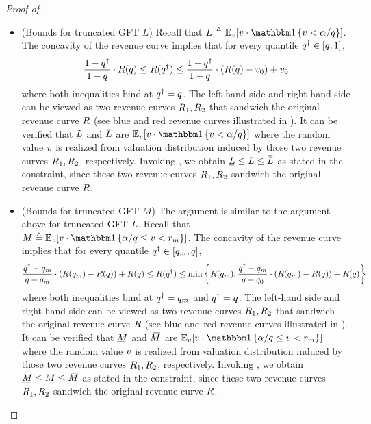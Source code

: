 \begin{proof}[Proof of ]
\begin{itemize}
        \item (Bounds for truncated GFT $L$) Recall that $L \triangleq \expect[\val]{\val\cdot \indicator{ \val < \revratio/\quant}}$. The concavity of the revenue curve implies that for every quantile $q^\dagger \in [q, 1]$,
        \begin{align*}
            \frac{1 - q^\dagger}{1 - q}\cdot R(q)
            \leq 
            R(q^\dagger) 
            \leq
            \frac{1 - q^\dagger}{1 - q}
            \cdot (R(q) - v_0)
            +
            v_0
        \end{align*}
        where both inequalities bind at $q^\dagger = q$. The left-hand side and right-hand side can be viewed as two revenue curves $R_1, R_2$ that sandwich the original revenue curve $R$ (see blue and red revenue curves illustrated in ). It can be verified that $\LUnderBar$ and $\LOverBar$ are $\expect[\val]{\val\cdot \indicator{ \val < \revratio/\quant}}$ where the random value $v$ is realized from valuation distribution induced by those two revenue curves $R_1, R_2$, respectively. Invoking , we obtain $\LUnderBar\leq L \leq \LOverBar$ as stated in the constraint, since these two revenue curves $R_1, R_2$ sandwich the original revenue curve $R$.
        \item (Bounds for truncated GFT $M$) The argument is similar to the argument above for truncated GFT $L$. Recall that $M \triangleq \expect[\val]{\val\cdot \indicator{ \revratio/\quant \leq \val <\optreserve }}$. The concavity of the revenue curve implies that for every quantile $q^\dagger \in [q_m, q]$,
        \begin{align*}
            \frac{q^\dagger - q_m}{q - q_m}\cdot (R(q_m) - R(q)) + R(q)
            \leq 
            R(q^\dagger) 
            \leq
            \min\left\{ R(q_m), 
            \frac{q^\dagger - q_m}{q - q_0}\cdot (R(q_m) - R(q)) + R(q)
            \right\}
        \end{align*}
        where both inequalities bind at $q^\dagger = q_m$ and $q^\dagger = q$. The left-hand side and right-hand side can be viewed as two revenue curves $R_1, R_2$ that sandwich the original revenue curve $R$ (see blue and red revenue curves illustrated in ). It can be verified that $\MUnderBar$ and $\MOverBar$ are $\expect[\val]{\val\cdot \indicator{ \revratio/\quant \leq \val <\optreserve }}$ where the random value $v$ is realized from valuation distribution induced by those two revenue curves $R_1, R_2$, respectively. Invoking , we obtain $\MUnderBar\leq M \leq \MOverBar$ as stated in the constraint, since these two revenue curves $R_1, R_2$ sandwich the original revenue curve $R$.

\end{itemize}
\end{proof}
